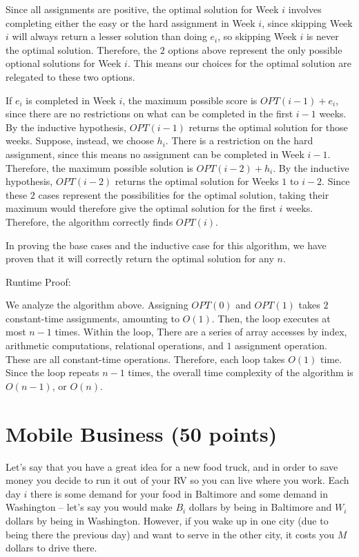 \documentclass[11pt]{article}
\begin{document}
\begin{enumerate}
Since all assignments are positive, the optimal solution for Week $i$ involves completing either the easy or the hard assignment in Week $i$, 
since skipping Week $i$ will always return a lesser solution than doing $e_i$, so skipping Week $i$ is never the optimal solution. 
Therefore, the $2$ options above represent the only possible optional solutions for Week $i$. 
This means our choices for the optimal solution are relegated to these two options.


If $e_i$ is completed in Week $i$, the maximum possible score is $OPT(i-1) + e_{i}$, since there are no restrictions on 
what can be completed in the first $i-1$ weeks. By the inductive hypothesis, $OPT(i-1)$ returns the optimal solution for those weeks. 
Suppose, instead, we choose $h_{i}$. There is a restriction on the hard assignment, since this means no assignment can be completed in Week $i-1$. 
Therefore, the maximum possible solution is $OPT(i-2) + h_{i}$. By the inductive hypothesis, $OPT(i-2)$ returns the optimal solution for 
Weeks $1$ to $i-2$. Since these $2$ cases represent the possibilities for the optimal solution, taking their maximum would therefore 
give the optimal solution for the first $i$ weeks. Therefore, the algorithm correctly finds $OPT(i)$.

In proving the base cases and the inductive case for this algorithm, we have proven that it will correctly return the optimal solution for any $n$.

\bigbreak

Runtime Proof:

We analyze the algorithm above. Assigning $OPT(0)$ and $OPT(1)$ takes $2$ constant-time assignments, amounting to $O(1)$. 
Then, the loop executes at most $n-1$ times. Within the loop, There are a series of  array accesses by index, 
arithmetic computations, relational operations, and $1$ assignment operation. These are all constant-time operations. 
Therefore, each loop takes $O(1)$ time. Since the loop repeats $n-1$ times, the overall time complexity of the algorithm 
is $O(n-1)$, or $O(n)$.

\end{enumerate}



\section{Mobile Business (50 points)}
Let's say that you have a great idea for a new food truck, and in order to save money you decide to run it out of your RV so you can live where you work. 
Each day $i$ there is some demand for your food in Baltimore and some demand in Washington -- let's say you would make $B_i$ dollars by being in Baltimore 
and $W_i$ dollars by being in Washington. However, if you wake up in one city (due to being there the previous day) and want to serve in the other city, 
it costs you $M$ dollars to drive there.  
\end{document}
